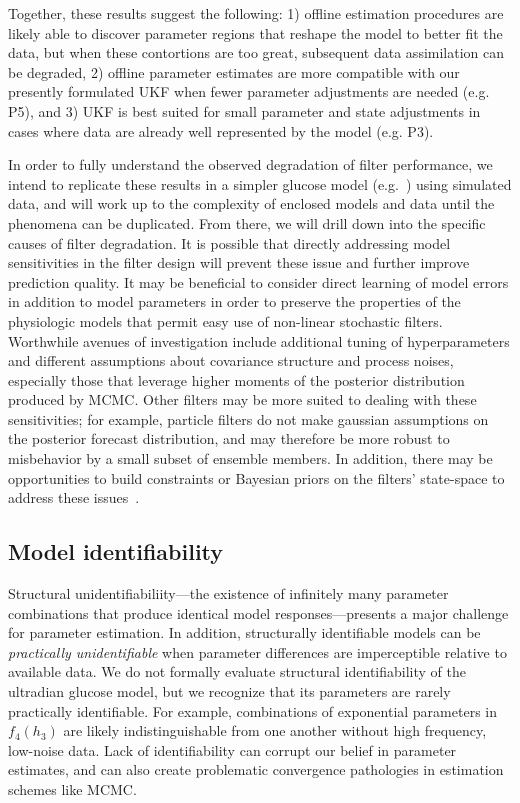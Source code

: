 \documentclass[10pt,letterpaper]{article}
\begin{document}
Together, these results suggest the following: 1) offline estimation procedures are likely able to discover parameter regions that reshape the model to better fit the data, but when these contortions are too great, subsequent data assimilation can be degraded, 2) offline parameter estimates are more compatible with our presently formulated UKF when fewer parameter adjustments are needed (e.g. P5), and 3) UKF is best suited for small parameter and state adjustments in cases where data are already well represented by the model (e.g. P3). 

In order to fully understand the observed degradation of filter performance, we intend to replicate these results in a simpler glucose model (e.g.~\cite{bergman_physiologic_1981}) using simulated data, and will work up to the complexity of enclosed models and data until the phenomena can be duplicated. From there, we will drill down into the specific causes of filter degradation. It is possible that directly addressing model sensitivities in the filter design will prevent these issue and further improve prediction quality. It may be beneficial to consider direct learning of model errors in addition to model parameters in order to preserve the properties of the physiologic models that permit easy use of non-linear stochastic filters. Worthwhile avenues of investigation include additional tuning of hyperparameters and different assumptions about covariance structure and process noises, especially those that leverage higher moments of the posterior distribution produced by MCMC. Other filters may be more suited to dealing with these sensitivities; for example, particle filters do not make gaussian assumptions on the posterior forecast distribution, and may therefore be more robust to misbehavior by a small subset of ensemble members. In addition, there may be opportunities to build constraints or Bayesian priors on the filters' state-space to address these issues~\cite{arnold_parameter_2014}.

\subsection{Model identifiability}
Structural unidentifiabiliity---the existence of infinitely many parameter combinations that produce identical model responses---presents a major challenge for parameter estimation. In addition, structurally identifiable models can be \emph{practically unidentifiable} when parameter differences are imperceptible relative to available data. 
We do not formally evaluate structural identifiability of the ultradian glucose model, but we recognize that its parameters are rarely practically identifiable. For example, combinations of exponential parameters in $f_4(h_3)$ are likely indistinguishable from one another without high frequency, low-noise data. Lack of identifiability can corrupt our belief in parameter estimates, and can also create problematic convergence pathologies in estimation schemes like MCMC.
\end{document}
